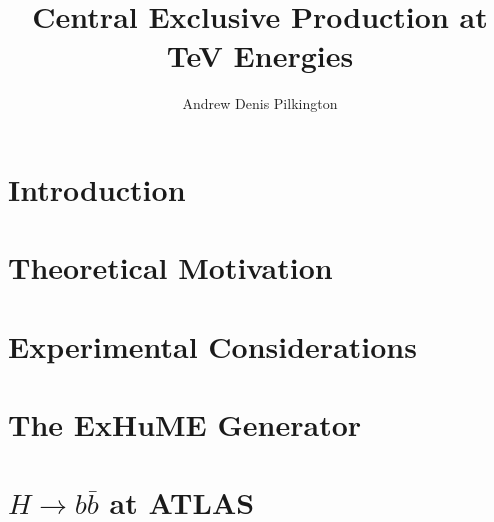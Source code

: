 \documentclass[12pt,PhD]{Thesis}
\begin{document}
\title{Central Exclusive Production at TeV Energies}
    \author{Andrew Denis Pilkington}


\beforeabstract
{}
    
\afterabstract
    
    
\afterpreface



\chapter{Introduction}



\chapter{Theoretical Motivation}



 

    
\chapter{Experimental Considerations}




\chapter{The ExHuME Generator}




\chapter{$H \rightarrow b\bar{b}$ at ATLAS} \label{higgsstudy}



\end{document}
